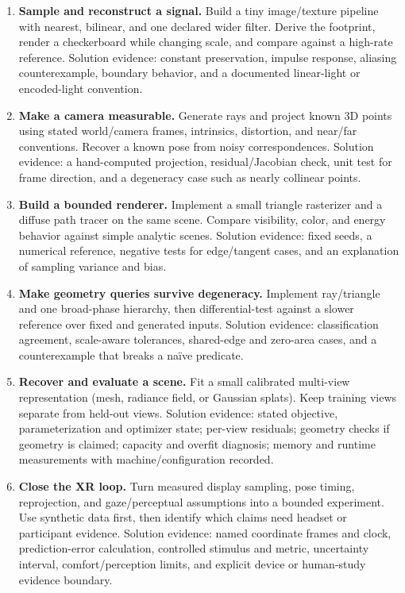 \begin{enumerate}
\def\labelenumi{\arabic{enumi}.}
\tightlist
\item
  \textbf{Sample and reconstruct a signal.} Build a tiny image/texture pipeline with nearest, bilinear, and one declared wider filter. Derive the footprint, render a checkerboard while changing scale, and compare against a high-rate reference. Solution evidence: constant preservation, impulse response, aliasing counterexample, boundary behavior, and a documented linear-light or encoded-light convention.
\item
  \textbf{Make a camera measurable.} Generate rays and project known 3D points using stated world/camera frames, intrinsics, distortion, and near/far conventions. Recover a known pose from noisy correspondences. Solution evidence: a hand-computed projection, residual/Jacobian check, unit test for frame direction, and a degeneracy case such as nearly collinear points.
\item
  \textbf{Build a bounded renderer.} Implement a small triangle rasterizer and a diffuse path tracer on the same scene. Compare visibility, color, and energy behavior against simple analytic scenes. Solution evidence: fixed seeds, a numerical reference, negative tests for edge/tangent cases, and an explanation of sampling variance and bias.
\item
  \textbf{Make geometry queries survive degeneracy.} Implement ray/triangle and one broad-phase hierarchy, then differential-test against a slower reference over fixed and generated inputs. Solution evidence: classification agreement, scale-aware tolerances, shared-edge and zero-area cases, and a counterexample that breaks a naïve predicate.
\item
  \textbf{Recover and evaluate a scene.} Fit a small calibrated multi-view representation (mesh, radiance field, or Gaussian splats). Keep training views separate from held-out views. Solution evidence: stated objective, parameterization and optimizer state; per-view residuals; geometry checks if geometry is claimed; capacity and overfit diagnosis; memory and runtime measurements with machine/configuration recorded.
\item
  \textbf{Close the XR loop.} Turn measured display sampling, pose timing, reprojection, and gaze/perceptual assumptions into a bounded experiment. Use synthetic data first, then identify which claims need headset or participant evidence. Solution evidence: named coordinate frames and clock, prediction-error calculation, controlled stimulus and metric, uncertainty interval, comfort/perception limits, and explicit device or human-study evidence boundary.
\end{enumerate}

